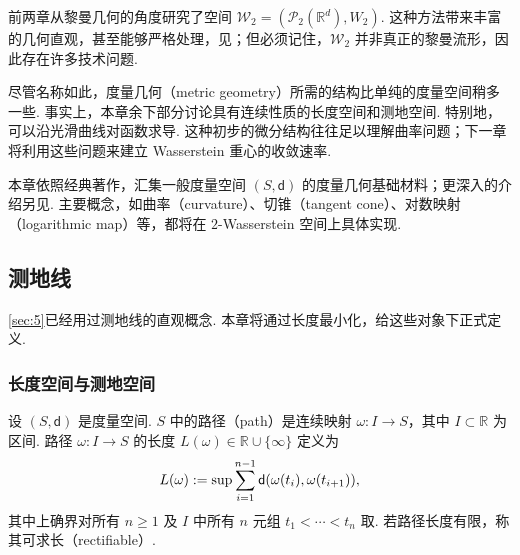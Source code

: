 前两章从黎曼几何的角度研究了空间 $\mathcal W_2=(\mathcal P_2(\mathbb R^d),W_2)$. 这种方法带来丰富的几何直观，甚至能够严格处理，见\cite{ref18}；但必须记住，$\mathcal W_2$ 并非真正的黎曼流形，因此存在许多技术问题.

尽管名称如此，度量几何（metric geometry）所需的结构比单纯的度量空间稍多一些. 事实上，本章余下部分讨论具有连续性质的长度空间和测地空间. 特别地，可以沿光滑曲线对函数求导. 这种初步的微分结构往往足以理解曲率问题；下一章将利用这些问题来建立 Wasserstein 重心的收敛速率.

本章依照经典著作\cite{ref59}，汇集一般度量空间 $(S,\mathsf d)$ 的度量几何基础材料；更深入的介绍另见\cite{ref7}. 主要概念，如曲率（curvature）、切锥（tangent cone）、对数映射（logarithmic map）等，都将在 $2$-Wasserstein 空间上具体实现.

\subsection{测地线}\label{sec:7.1}
\autoref{sec:5}已经用过测地线的直观概念. 本章将通过长度最小化，给这些对象下正式定义.

\subsubsection{长度空间与测地空间}\label{sec:7.1.1}
设 $(S,\mathsf d)$ 是度量空间. $S$ 中的路径（path）是连续映射 $\omega:I\to S$，其中 $I\subset\mathbb R$ 为区间. 路径 $\omega:I\to S$ 的长度 $L(\omega)\in\mathbb R\cup\{\infty\}$ 定义为
\begin{equation}\label{eq:7.1}\index{length@长度（length）|hyperpage}
L(\omega):=\sup\sum_{i=1}^{n-1}\mathsf d(\omega(t_i),\omega(t_{i+1})),
\end{equation}
其中上确界对所有 $n\ge1$ 及 $I$ 中所有 $n$ 元组 $t_1<\cdots<t_n$ 取. 若路径长度有限，称其可求长（rectifiable）.

